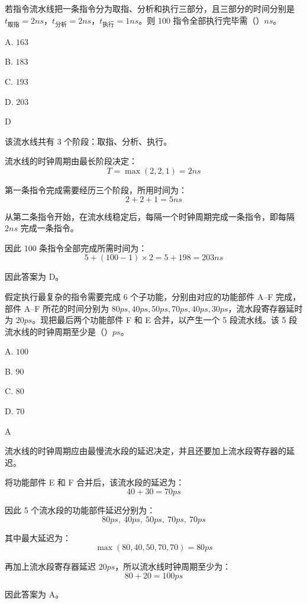 \begin{question}
若指令流水线把一条指令分为取指、分析和执行三部分，且三部分的时间分别是 $t_{\text{取指}}=2ns$，$t_{\text{分析}}=2ns$，$t_{\text{执行}}=1ns$。则 100 指令全部执行完毕需（）$ns$。

A. $163$

B. $183$

C. $193$

D. $203$
\end{question}

\begin{answer}
D
\end{answer}

\begin{analysisenv}
该流水线共有 3 个阶段：取指、分析、执行。

流水线的时钟周期由最长阶段决定：
\[
T=\max(2,2,1)=2ns
\]

第一条指令完成需要经历三个阶段，所用时间为：
\[
2+2+1=5ns
\]

从第二条指令开始，在流水线稳定后，每隔一个时钟周期完成一条指令，即每隔 $2ns$ 完成一条指令。

因此 100 条指令全部完成所需时间为：
\[
5+(100-1)\times 2=5+198=203ns
\]

因此答案为 D。
\end{analysisenv}



\begin{question}
假定执行最复杂的指令需要完成 6 个子功能，分别由对应的功能部件 A--F 完成，部件 A--F 所花的时间分别为 $80ps,40ps,50ps,70ps,40ps,30ps$，流水段寄存器延时为 $20ps$。现把最后两个功能部件 F 和 E 合并，以产生一个 5 段流水线。该 5 段流水线的时钟周期至少是（）$ps$。

A. $100$

B. $90$

C. $80$

D. $70$
\end{question}

\begin{answer}
A
\end{answer}

\begin{analysisenv}
流水线的时钟周期应由最慢流水段的延迟决定，并且还要加上流水段寄存器的延迟。

将功能部件 E 和 F 合并后，该流水段的延迟为：
\[
40 + 30 = 70ps
\]

因此 5 个流水段的功能部件延迟分别为：
\[
80ps,\ 40ps,\ 50ps,\ 70ps,\ 70ps
\]

其中最大延迟为：
\[
\max(80,40,50,70,70)=80ps
\]

再加上流水段寄存器延迟 $20ps$，所以流水线时钟周期至少为：
\[
80+20=100ps
\]

因此答案为 A。
\end{analysisenv}


